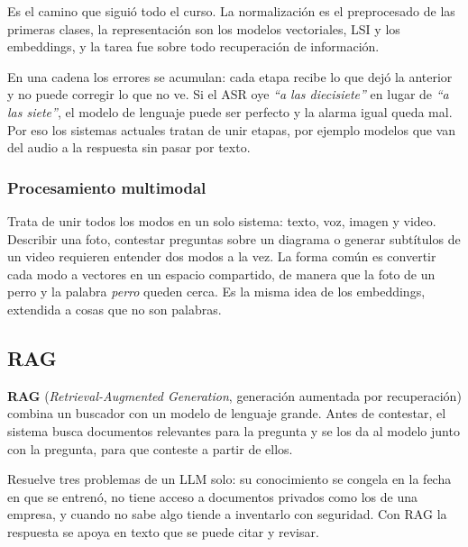 \documentclass[11pt,letterpaper]{article}
\begin{document}
Es el camino que siguió todo el curso. La normalización es el
preprocesado de las primeras clases, la representación son los
modelos vectoriales, LSI y los embeddings, y la tarea fue sobre todo
recuperación de información.

\begin{ojo}
    En una cadena los errores se acumulan: cada etapa recibe lo que dejó
    la anterior y no puede corregir lo que no ve. Si el ASR oye
    \textit{``a las diecisiete''} en lugar de \textit{``a las
    siete''}, el modelo de lenguaje puede ser perfecto y la alarma
    igual queda mal. Por eso los sistemas actuales tratan de unir
    etapas, por ejemplo modelos que van del audio a la respuesta sin
    pasar por texto.
\end{ojo}

\subsubsection*{Procesamiento multimodal}

Trata de unir todos los modos en un solo sistema: texto, voz, imagen y
video. Describir una foto, contestar preguntas sobre un diagrama o
generar subtítulos de un video requieren entender dos modos a la vez.
La forma común es convertir cada modo a vectores en un espacio
compartido, de manera que la foto de un perro y la palabra
\textit{perro} queden cerca. Es la misma idea de los embeddings,
extendida a cosas que no son palabras.


\subsection*{RAG}

\textbf{RAG} (\textit{Retrieval-Augmented Generation}, generación
aumentada por recuperación) combina un buscador con un modelo de
lenguaje grande. Antes de contestar, el sistema busca documentos
relevantes para la pregunta y se los da al modelo junto con la
pregunta, para que conteste a partir de ellos.

Resuelve tres problemas de un LLM solo: su conocimiento se congela en
la fecha en que se entrenó, no tiene acceso a documentos privados como
los de una empresa, y cuando no sabe algo tiende a inventarlo con
seguridad. Con RAG la respuesta se apoya en texto que se puede citar y
revisar.
\end{document}
